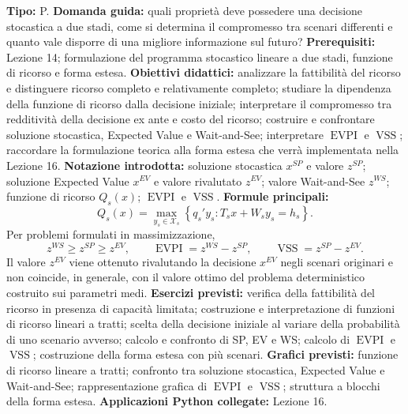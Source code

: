\documentclass[12pt,a4paper]{article}%
\newcommand{\1}{\mathbf{1}}
\begin{document}
\textbf{Tipo:} P.\newline
\textbf{Domanda guida:} quali propriet\`{a} deve possedere una decisione
stocastica a due stadi, come si determina il compromesso tra scenari
differenti e quanto vale disporre di una migliore informazione sul futuro?
\newline
\textbf{Prerequisiti:} Lezione 14; formulazione del programma stocastico
lineare a due stadi, funzione di ricorso e forma estesa.
\newline
\textbf{Obiettivi didattici:} analizzare la fattibilit\`{a} del ricorso e
distinguere ricorso completo e relativamente completo; studiare la dipendenza
della funzione di ricorso dalla decisione iniziale; interpretare il
compromesso tra redditivit\`{a} della decisione ex ante e costo del ricorso;
costruire e confrontare soluzione stocastica, Expected Value e Wait-and-See;
interpretare $\operatorname{EVPI}$ e $\operatorname{VSS}$; raccordare la
formulazione teorica alla forma estesa che verr\`{a} implementata nella
Lezione 16.
\newline
\textbf{Notazione introdotta:} soluzione stocastica $x^{SP}$ e valore
$z^{SP}$; soluzione Expected Value $x^{EV}$ e valore rivalutato $z^{EV}$;
valore Wait-and-See $z^{WS}$; funzione di ricorso $Q_s(x)$;
$\operatorname{EVPI}$ e $\operatorname{VSS}$.
\newline
\textbf{Formule principali:}
\[
Q_s(x)
=
\max_{y_s\in\mathcal X_s}
\left\{
q_s'y_s:
T_sx+W_sy_s=h_s
\right\}.
\]
Per problemi formulati in massimizzazione,
\[
z^{WS}\geq z^{SP}\geq z^{EV},
\qquad
\operatorname{EVPI}=z^{WS}-z^{SP},
\qquad
\operatorname{VSS}=z^{SP}-z^{EV}.
\]
Il valore $z^{EV}$ viene ottenuto rivalutando la decisione $x^{EV}$ negli
scenari originari e non coincide, in generale, con il valore ottimo del
problema deterministico costruito sui parametri medi.
\newline
\textbf{Esercizi previsti:} verifica della fattibilit\`{a} del ricorso in
presenza di capacit\`{a} limitata; costruzione e interpretazione di funzioni
di ricorso lineari a tratti; scelta della decisione iniziale al variare della
probabilit\`{a} di uno scenario avverso; calcolo e confronto di SP, EV e WS;
calcolo di $\operatorname{EVPI}$ e $\operatorname{VSS}$; costruzione della
forma estesa con pi\`{u} scenari.
\newline
\textbf{Grafici previsti:} funzione di ricorso lineare a tratti; confronto
tra soluzione stocastica, Expected Value e Wait-and-See; rappresentazione
grafica di $\operatorname{EVPI}$ e $\operatorname{VSS}$; struttura a blocchi
della forma estesa.
\newline
\textbf{Applicazioni Python collegate:} Lezione 16.
\end{document}

